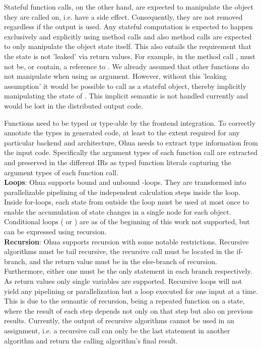 Stateful function calls, on the other hand, are expected to manipulate the object they are called on, i.e. have a side effect. Consequently, they are not removed regardless if the output is used. 
Any stateful computation is expected to happen exclusively and explicitly using method calls and also method calls are expected to only manipulate the object state itself. This also entails the requirement that the state is not 'leaked' via return values. For example, in the method call ,  must not be, or contain, a reference to . We already assumed that other functions do not manipulate  when using  as argument. However, without this 'leaking assumption' it would be possible to call  as a stateful object, thereby implicitly manipulating the state of . This implicit semantic is not handled currently and would be lost in the distributed output code. 

Functions need to be typed or type-able by the frontend integration. To correctly annotate the types in generated code, at least to the extent required for any particular backend and architecture, Ohua needs to extract type information from the input code. Specifically the argument types of each function call are extracted and preserved in the different IRs as typed function literals capturing the argument types of each function call. \\

\textbf{Loops}: Ohua supports bound and unbound -loops. They are transformed into parallelizable pipelining of the independent calculation steps inside the loop. Inside for-loops, each state from outside the loop must be used at most once to enable the accumulation of state changes in a single node for each object. Conditional loops ( or ) are as of the beginning of this work not supported, but can be expressed using recursion.\\

\textbf{Recursion}: Ohua supports recursion with some notable restrictions. Recursive algorithms must be tail recursive, the recursive call must be located in the if-branch, and the return value must be in the else-branch of recursion. Furthermore, either one must be the only statement in each branch respectively. As return values only single variables are supported. Recursive loops will not yield any pipelining or parallelization but a loop executed for one input at a time. This is due to the semantic of recursion, being a repeated function on a state, where the result of each step depends not only on that step but also on previous results.
Currently, the output of recursive algorithms cannot be used in an assignment, i.e. a recursive call can only be the last statement in another algorithm and return the calling algorithm's final result. \\

